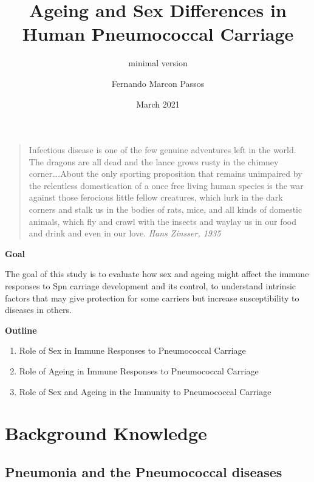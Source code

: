 \documentclass[
]{book}
\title{Ageing and Sex Differences in Human Pneumococcal Carriage}
\subtitle{minimal version}
\author{Fernando Marcon Passos}
\date{March 2021}
\begin{document}
\maketitle

{
\setcounter{tocdepth}{1}
\tableofcontents
}
\begin{quote}
Infectious disease is one of the few genuine adventures left in the world. The dragons are all dead and the lance grows rusty in the chimney corner\ldots.About the only sporting proposition that remains unimpaired by the relentless domestication of a once free living human species is the war against those ferocious little fellow creatures, which lurk in the dark corners and stalk us in the bodies of rats, mice, and all kinds of domestic animals, which fly and crawl with the insects and waylay us in our food and drink and even in our love. \emph{Hans Zinsser, 1935}
\end{quote}

\textbf{Goal}

The goal of this study is to evaluate how sex and ageing might affect the immune responses to Spn carriage development and its control, to understand intrinsic factors that may give protection for some carriers but increase susceptibility to diseases in others.

\textbf{Outline}

\begin{enumerate}
\def\labelenumi{\arabic{enumi}.}
\item
  Role of Sex in Immune Responses to Pneumococcal Carriage
\item
  Role of Ageing in Immune Responses to Pneumococcal Carriage
\item
  Role of Sex and Ageing in the Immunity to Pneumococcal Carriage
\end{enumerate}

\hypertarget{intro}{%
\chapter{Background Knowledge}\label{intro}}

\hypertarget{pneumonia-and-the-pneumococcal-diseases}{%
\section{Pneumonia and the Pneumococcal diseases}\label{pneumonia-and-the-pneumococcal-diseases}}
\end{document}

